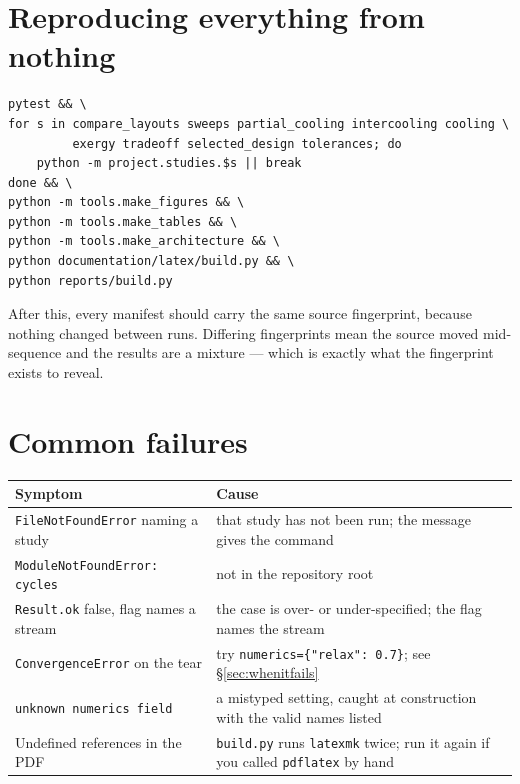 \documentclass[11pt,a4paper]{report}
\newcommand{\code}[1]{\texttt{\small #1}}
\begin{document}
\section{Reproducing everything from nothing}

\begin{verbatim}
pytest && \
for s in compare_layouts sweeps partial_cooling intercooling cooling \
         exergy tradeoff selected_design tolerances; do
    python -m project.studies.$s || break
done && \
python -m tools.make_figures && \
python -m tools.make_tables && \
python -m tools.make_architecture && \
python documentation/latex/build.py && \
python reports/build.py
\end{verbatim}

After this, every manifest should carry the same source fingerprint,
because nothing changed between runs. Differing fingerprints mean the
source moved mid-sequence and the results are a mixture --- which is
exactly what the fingerprint exists to reveal.

\section{Common failures}

\begin{center}
\small
\begin{tabular}{@{}p{5.4cm}p{8.2cm}@{}}
\toprule
Symptom & Cause \\
\midrule
\code{FileNotFoundError} naming a study & that study has not been run;
the message gives the command \\[2pt]
\code{ModuleNotFoundError: cycles} & not in the repository root \\[2pt]
\code{Result.ok} false, flag names a stream & the case is
over- or under-specified; the flag names the stream \\[2pt]
\code{ConvergenceError} on the tear & try \code{numerics=\{"relax":
0.7\}}; see \S\ref{sec:whenitfails} \\[2pt]
\code{unknown numerics field} & a mistyped setting, caught at
construction with the valid names listed \\[2pt]
Undefined references in the PDF & \code{build.py} runs \code{latexmk}
twice; run it again if you called \code{pdflatex} by hand \\
\bottomrule
\end{tabular}
\end{center}

\end{document}
